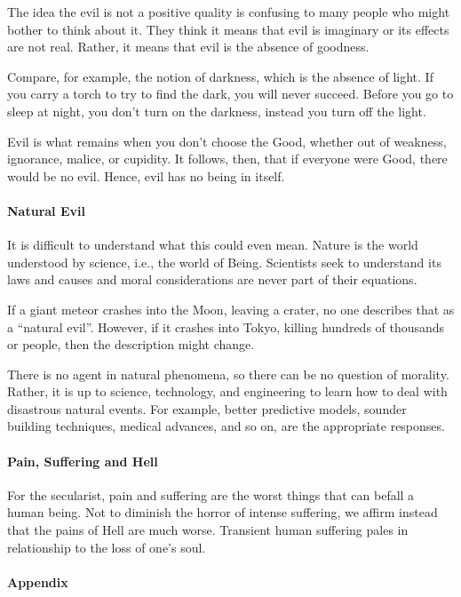 The idea the evil is not a positive quality is confusing to many people who might bother to think about it. They think it means that evil is imaginary or its effects are not real. Rather, it means that evil is the absence of goodness.

Compare, for example, the notion of darkness, which is the absence of light. If you carry a torch to try to find the dark, you will never succeed. Before you go to sleep at night, you don't turn on the darkness, instead you turn off the light.

Evil is what remains when you don't choose the Good, whether out of weakness, ignorance, malice, or cupidity. It follows, then, that if everyone were Good, there would be no evil. Hence, evil has no being in itself.

\paragraph{Natural Evil}


It is difficult to understand what this could even mean. Nature is the world understood by science, i.e., the world of Being. Scientists seek to understand its laws and causes and moral considerations are never part of their equations.

If a giant meteor crashes into the Moon, leaving a crater, no one describes that as a ``natural evil''. However, if it crashes into Tokyo, killing hundreds of thousands or people, then the description might change.

There is no agent in natural phenomena, so there can be no question of morality. Rather, it is up to science, technology, and engineering to learn how to deal with disastrous natural events. For example, better predictive models, sounder building techniques, medical advances, and so on, are the appropriate responses.

\paragraph{Pain, Suffering and Hell}


For the secularist, pain and suffering are the worst things that can befall a human being. Not to diminish the horror of intense suffering, we affirm instead that the pains of Hell are much worse. Transient human suffering pales in relationship to the loss of one's soul.

\paragraph{Appendix}


